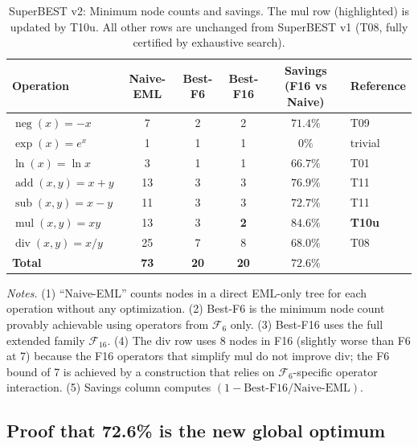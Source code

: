 \documentclass[12pt,a4paper]{article}
\theoremstyle{definition}
\begin{document}
\begin{table}[h]
\centering
\caption{SuperBEST v2: Minimum node counts and savings.  The mul row
         (highlighted) is updated by T10u.  All other rows are unchanged
         from SuperBEST v1 (T08, fully certified by exhaustive search).}
\label{tab:superbest}
\smallskip
\begin{tabular}{@{}lccccl@{}}
\toprule
\textbf{Operation} & \textbf{Naive-EML} & \textbf{Best-F6} &
\textbf{Best-F16} & \textbf{Savings (F16 vs Naive)} & \textbf{Reference} \\
\midrule
$\operatorname{neg}(x)=-x$         & 7  & 2 & 2 & $71.4\%$ & T09 \\
$\operatorname{exp}(x)=e^x$        & 1  & 1 & 1 & $0\%$    & trivial \\
$\operatorname{ln}(x)=\ln x$       & 3  & 1 & 1 & $66.7\%$ & T01 \\
$\operatorname{add}(x,y)=x+y$      & 13 & 3 & 3 & $76.9\%$ & T11 \\
$\operatorname{sub}(x,y)=x-y$      & 11 & 3 & 3 & $72.7\%$ & T11 \\
$\operatorname{mul}(x,y)=xy$       & 13 & 3 & \textbf{2} & $\mathbf{84.6\%}$ & \textbf{T10u} \\
$\operatorname{div}(x,y)=x/y$      & 25 & 7 & 8 & $68.0\%$ & T08 \\
\midrule
\textbf{Total}                     & \textbf{73} & \textbf{20} & \textbf{20} &
  $\mathbf{72.6\%}$ & \\
\bottomrule
\end{tabular}

\smallskip
\footnotesize{%
\textit{Notes.}
(1) ``Naive-EML'' counts nodes in a direct EML-only tree for each operation
without any optimization.
(2) Best-F6 is the minimum node count provably achievable using operators
from $\mathcal{F}_6$ only.
(3) Best-F16 uses the full extended family $\mathcal{F}_{16}$.
(4) The div row uses 8 nodes in F16 (slightly worse than F6 at 7) because
the F16 operators that simplify mul do not improve div; the F6 bound of 7
is achieved by a construction that relies on $\mathcal{F}_6$-specific
operator interaction.
(5) Savings column computes $(1 - \text{Best-F16}/\text{Naive-EML})$.
}
\end{table}

\subsection{Proof that 72.6\% is the new global optimum}
\end{document}
